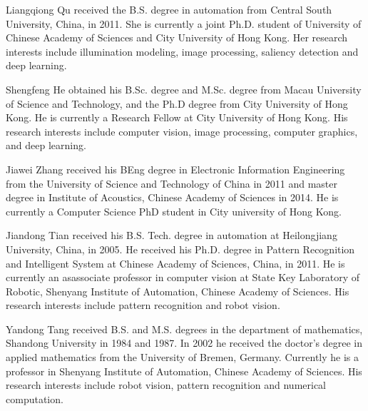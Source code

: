 \documentclass[journal]{IEEEtran}
\begin{document}
\begin{IEEEbiography}{Liangqiong Qu}
received the B.S. degree in automation from Central South University, China, in 2011. She is currently a joint Ph.D. student
of University of Chinese Academy of Sciences and City University of Hong Kong. Her research interests include illumination modeling, image processing, saliency detection and deep learning.
\end{IEEEbiography}

\begin{IEEEbiography}{Shengfeng He} obtained his B.Sc. degree and M.Sc. degree from Macau University of Science and Technology, and the Ph.D degree from City University of Hong Kong. He is currently a Research Fellow at City University of Hong Kong. His research interests include computer vision, image processing, computer graphics, and deep learning.
\end{IEEEbiography}

\begin{IEEEbiography}{Jiawei Zhang} received his BEng degree in Electronic Information Engineering from the University of
Science and Technology of China in 2011 and master degree in Institute of Acoustics, Chinese Academy of Sciences in 2014. He is currently a Computer Science PhD student in City university of Hong Kong.
\end{IEEEbiography}

\begin{IEEEbiography}{Jiandong Tian}
received his B.S. Tech. degree in automation at Heilongjiang University, China, in 2005.
He received his Ph.D. degree in Pattern Recognition and Intelligent System at Chinese Academy of Sciences, China, in 2011.
He is currently an asassociate professor in computer vision at State Key Laboratory of Robotic, Shenyang Institute of Automation,
Chinese Academy of Sciences. His research interests include pattern recognition and robot vision.
\end{IEEEbiography}

\begin{IEEEbiography}{Yandong Tang}
received B.S. and M.S. degrees in the department of mathematics, Shandong University in 1984 and 1987.
In 2002 he received the doctor's degree in applied mathematics from the University of Bremen, Germany. Currently he is a professor in Shenyang
Institute of Automation, Chinese Academy of Sciences. His research interests include robot vision, pattern recognition and numerical computation.
\end{IEEEbiography}
\end{document}
